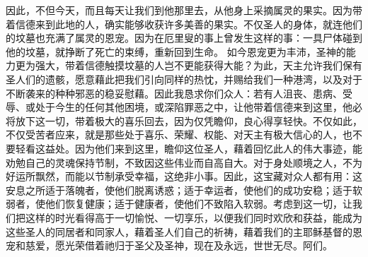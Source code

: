 因此，不但今天，而且每天让我们到他那里去，从他身上采摘属灵的果实。因为带着信德来到此地的人，确实能够收获许多美善的果实。不仅圣人的身体，就连他们的坟墓也充满了属灵的恩宠。因为在厄里叟的事上曾发生这样的事：一具尸体碰到他的坟墓，就挣断了死亡的束缚，重新回到生命。 如今恩宠更为丰沛，圣神的能力更为强大，带着信德触摸坟墓的人岂不更能获得大能？为此，天主允许我们保有圣人们的遗骸，愿意藉此把我们引向同样的热忱，并赐给我们一种港湾，以及对于不断袭来的种种邪恶的稳妥慰藉。因此我恳求你们众人：若有人沮丧、患病、受辱、或处于今生的任何其他困境，或深陷罪恶之中，让他带着信德来到这里，他必将放下这一切，带着极大的喜乐回去，因为仅凭瞻仰，良心得享轻快。不仅如此，不仅受苦者应来，就是那些处于喜乐、荣耀、权能、对天主有极大信心的人，也不要轻看这益处。因为他们来到这里，瞻仰这位圣人，藉着回忆此人的伟大事迹，能劝勉自己的灵魂保持节制，不致因这些伟业而自高自大。对于身处顺境之人，不为好运所飘然，而能以节制承受幸福，这绝非小事。因此，这宝藏对众人都有用：这安息之所适于落魄者，使他们脱离诱惑；适于幸运者，使他们的成功安稳；适于软弱者，使他们恢复健康；适于健康者，使他们不致陷入软弱。考虑到这一切，让我们把这样的时光看得高于一切愉悦、一切享乐，以便我们同时欢欣和获益，能成为这些圣人的同居者和同家人，藉着圣人们自己的祈祷，藉着我们的主耶稣基督的恩宠和慈爱，愿光荣借着祂归于圣父及圣神，现在及永远，世世无尽。阿们。\par

